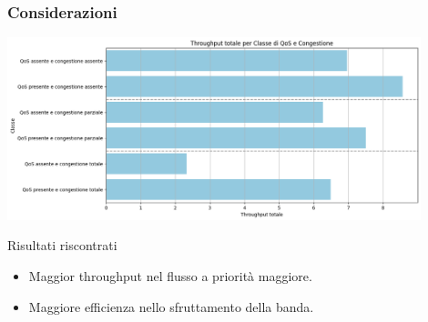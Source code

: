 \documentclass{beamer}
\begin{document}
\begin{frame}
    \frametitle{Considerazioni}
    \centering
    \includegraphics[width=0.9\textwidth]{throughput_bar.png}
    \begin{block}{Risultati riscontrati}
        \begin{itemize}
            \item Maggior throughput nel flusso a priorità maggiore.
            \item Maggiore efficienza nello sfruttamento della banda.
        \end{itemize}
    \end{block}
\end{frame}

\end{document}
